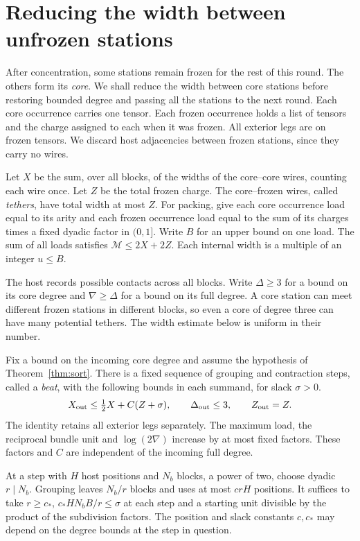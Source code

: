 \section{Reducing the width between unfrozen stations}
\label{subsec:core-width}

After concentration, some stations remain frozen for the rest of this
round. The others form its \emph{core}. We shall reduce the width
between core stations before restoring bounded degree and passing all
the stations to the next round. Each core occurrence carries one
tensor. Each frozen occurrence holds a list of tensors and the charge
assigned to each when it was frozen. All exterior legs are on frozen
tensors. We discard host adjacencies between frozen stations, since they
carry no wires.

Let \(X\) be the sum, over all blocks, of the widths of the core--core
wires, counting each wire once. Let \(Z\) be the total frozen charge.
The core--frozen wires, called \emph{tethers}, have total width at most
\(Z\). For packing, give each core occurrence load equal to its arity
and each frozen occurrence load equal to the sum of its charges times
a fixed dyadic factor in \((0,1]\). Write \(B\) for an upper bound on
one load. The sum of all loads satisfies \(\mathcal M\le 2X+2Z\).
Each internal width is a multiple of an integer \(u\le B\).

The host records possible contacts across all blocks. Write \(\Delta\ge3\)
for a bound on its core degree and \(\nabla\ge\Delta\) for a bound on
its full degree. A core station can meet different frozen stations in
different blocks, so even a core of degree three can have many potential
tethers. The width estimate below is uniform in their number.

\begin{lemma}\label{lem:core-width}
Fix a bound on the incoming core degree and assume the hypothesis of
Theorem~\ref{thm:sort}. There is a fixed sequence of grouping and
contraction steps, called a \emph{beat}, with the following bounds
in each summand, for slack \(\sigma>0\).
\[
 X_{\rm out}\le \tfrac12 X+C(Z+\sigma),\qquad
 \Delta_{\rm out}\le3,\qquad Z_{\rm out}=Z.
\]
The identity retains all exterior legs separately. The maximum load,
the reciprocal bundle unit and \(\log(2\nabla)\) increase by at most
fixed factors. These factors and \(C\) are independent of the
incoming full degree.

At a step with \(H\) host positions and \(N_b\) blocks, a power of two,
choose dyadic \(r\mid N_b\). Grouping leaves \(N_b/r\) blocks and uses
at most \(crH\) positions. It suffices to take
\(r\ge c_*\), \(c_*HN_bB/r\le\sigma\) at each step and a starting
unit divisible by the product of the subdivision factors. The
position and slack constants \(c,c_*\) may depend on the degree
bounds at the step in question.
\end{lemma}

